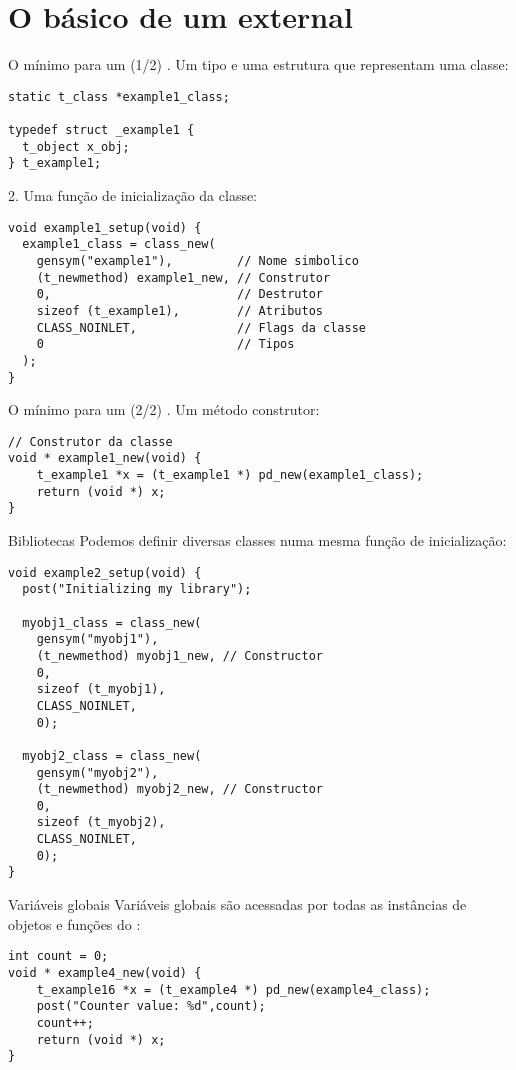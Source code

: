 \section{O básico de um external}


\begin{frame}[fragile]{O mínimo para um \external (1/2)}
. Um tipo e uma estrutura que representam uma classe: 
\begin{lstlisting}
static t_class *example1_class;

typedef struct _example1 {
  t_object x_obj;
} t_example1;
\end{lstlisting}
2. Uma função de inicialização da classe:
\begin{lstlisting}[firstnumber=last]
void example1_setup(void) {
  example1_class = class_new(
    gensym("example1"),         // Nome simbolico
    (t_newmethod) example1_new, // Construtor
    0,                          // Destrutor
    sizeof (t_example1),        // Atributos
    CLASS_NOINLET,              // Flags da classe
    0                           // Tipos
  );
}
\end{lstlisting}
\end{frame}


\begin{frame}[fragile]{O mínimo para um \external (2/2)}
. Um método construtor:
\begin{lstlisting}[firstnumber=last]
// Construtor da classe
void * example1_new(void) {
    t_example1 *x = (t_example1 *) pd_new(example1_class);
    return (void *) x;
}
\end{lstlisting}
\end{frame}


\begin{frame}[fragile]{Bibliotecas}
Podemos definir diversas classes numa mesma função de inicialização:
\begin{lstlisting}
void example2_setup(void) {
  post("Initializing my library");

  myobj1_class = class_new(
    gensym("myobj1"),
    (t_newmethod) myobj1_new, // Constructor
    0,
    sizeof (t_myobj1),
    CLASS_NOINLET,
    0);

  myobj2_class = class_new(
    gensym("myobj2"),
    (t_newmethod) myobj2_new, // Constructor
    0,
    sizeof (t_myobj2),
    CLASS_NOINLET,
    0);
}
\end{lstlisting}
\end{frame}


\begin{frame}[fragile]{Variáveis globais}
Variáveis globais são acessadas por todas as instâncias de objetos e funções
do \external:
\begin{lstlisting}
int count = 0;
void * example4_new(void) {
    t_example16 *x = (t_example4 *) pd_new(example4_class);
    post("Counter value: %d",count);
    count++;
    return (void *) x;
}
\end{lstlisting}
\end{frame}


